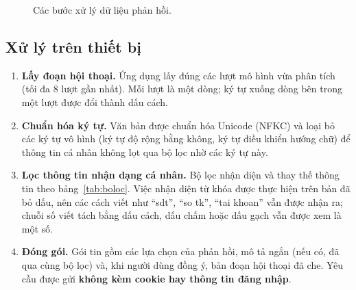 \documentclass[11pt,a4paper]{article}
\begin{document}
\begin{figure}[H]
\centering
{}
\caption{Các bước xử lý dữ liệu phản hồi.}
\label{fig:xuly}
\end{figure}

\subsection{Xử lý trên thiết bị}

\begin{enumerate}[leftmargin=*]
\item \textbf{Lấy đoạn hội thoại.} Ứng dụng lấy đúng các lượt mô hình vừa phân tích (tối đa 8 lượt gần nhất).
  Mỗi lượt là một dòng; ký tự xuống dòng bên trong một lượt được đổi thành dấu cách.
\item \textbf{Chuẩn hóa ký tự.} Văn bản được chuẩn hóa Unicode (NFKC) và loại bỏ các ký tự vô hình (ký tự độ rộng
  bằng không, ký tự điều khiển hướng chữ) để thông tin cá nhân không lọt qua bộ lọc nhờ các ký tự này.
\item \textbf{Lọc thông tin nhận dạng cá nhân.} Bộ lọc nhận diện và thay thế thông tin theo bảng~\ref{tab:boloc}.
  Việc nhận diện từ khóa được thực hiện trên bản đã bỏ dấu, nên các cách viết như ``sdt'', ``so tk'', ``tai khoan''
  vẫn được nhận ra; chuỗi số viết tách bằng dấu cách, dấu chấm hoặc dấu gạch vẫn được xem là một số.
\item \textbf{Đóng gói.} Gói tin gồm các lựa chọn của phản hồi, mô tả ngắn (nếu có, đã qua cùng bộ lọc) và, khi người
  dùng đồng ý, bản đoạn hội thoại đã che. Yêu cầu được gửi \textbf{không kèm cookie hay thông tin đăng nhập}.
\end{enumerate}
\end{document}
